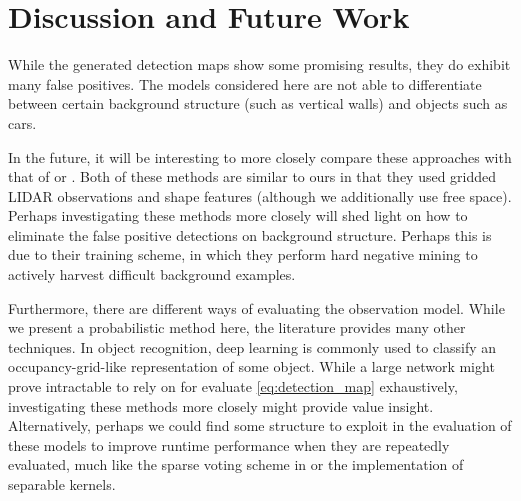 \section{Discussion and Future Work} \label{sec:discussion}

While the generated detection maps show some promising results, they do exhibit
many false positives. The models considered here are not able to differentiate
between certain background structure (such as vertical walls) and objects such
as cars.

In the future, it will be interesting to more closely compare these approaches
with that of \citep{wang2015RSS} or \citep{Engelcke2017ICRA}. Both of these
methods are similar to ours in that they used gridded \ac{LIDAR} observations
and shape features (although we additionally use free space). Perhaps
investigating these methods more closely will shed light on how to eliminate the
false positive detections on background structure. Perhaps this is due to their
training scheme, in which they perform hard negative mining to actively harvest
difficult background examples.

Furthermore, there are different ways of evaluating the observation model. While
we present a probabilistic method here, the literature provides many other
techniques. In object recognition, deep learning is commonly used to classify an
occupancy-grid-like representation of some object. While a large network might
prove intractable to rely on for evaluate \eqref{eq:detection_map} exhaustively,
investigating these methods more closely might provide value insight.
Alternatively, perhaps we could find some structure to exploit in the evaluation
of these models to improve runtime performance when they are repeatedly
evaluated, much like the sparse voting scheme in \citet{wang2015RSS} or the
implementation of separable kernels.
